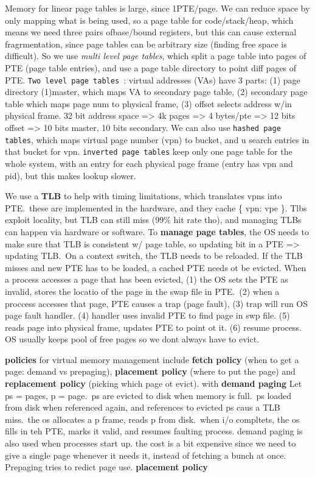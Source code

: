 Memory for linear page tables is large, since 1PTE/page. We can reduce space by
only mapping what is being used, so a page table for code/stack/heap, which
means we need three pairs ofbase/bound registers, but this can cause external
fragrmentation, since page tables can be arbitrary size (finding free space is
difficult). So we use {\it multi level page tables}, which split a page table
into pages of PTE (page table entries), and use a page table directory to point
diff pages of PTE. {\tt Two level page tables }: virtual addresses (VAs) have 3
parts: (1) page directory (1)master, which maps VA to secondary page table, (2) secondary
page table which maps page num to physical frame, (3) offset selects address
w/in physical frame. 32 bit address space => 4k pages => 4 bytes/pte => 12 bits
offset => 10 bits master, 10 bits secondary. We can also use {\tt hashed page
tables}, which maps virtual page number (vpn) to bucket, and u search entries
in that bucket for vpn. {\tt inverted page tables} keep only one page table for
the whole system, with an entry for each physical page frame (entry has vpn and
pid), but this makes lookup slower.

We use a {\bf TLB} to help with timing limitations, which translates vpns into
PTE.\ these are implemented in the hardware, and they cache \{ vpn: vpe \}. Tlbs
exploit locality, but TLB can still miss (99\% hit rate tho), and managing TLBs
can happen via hardware or software. To {\bf manage page tables}, the OS needs
to make sure that TLB is consistent w/ page table, so updating bit in a PTE =>
updating TLB.\ On a context switch, the TLB needs to be reloaded. If the TLB
misses and new PTE has to be loaded, a cached PTE needs ot be evicted. When a
process accesses a page that has been evicted, (1) the OS sets the PTE as
invalid, stores the locatio of the page in the swap file in PTE.\ (2) when a
proccess accesses that page, PTE causes a trap (page fault), (3) trap will run
OS page fault handler. (4) handler uses invalid PTE to find page in swp file.
(5) reads page into physical frame, updates PTE to point ot it. (6) resume
process. OS usually keeps pool of free pages so we dont always have to evict.

{\bf policies } for virtual memory management include {\bf fetch policy} (when
to get a page: demand vs prepaging), {\bf placement policy} (where to put the page) and {\bf
replacement policy} (picking which page ot evict).
with {\bf demand paging} Let ps = pages, p = page.\ ps are evicted to disk when memory is
full.\ ps loaded from disk when referenced again, and references to evicted ps
caus a TLB miss.\ the os allocates a p frame, reads p from disk.\ when i/o
compltets, the os fills in teh PTE, marks it valid, and resumes faulting
process. demand paging is also used when processes start up. the cost is a bit
expensive since we need to give a single page whenever it needs it, instead of
fetching a bunch at once. Prepaging tries to redict page use. {\bf placement policy}

